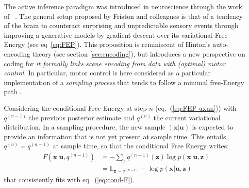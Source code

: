 \documentclass[12pt,twoside,openright]{article}
\begin{document}
The active inference paradigm was introduced in neuroscience through the work of ~\cite{friston2010free,friston2012perceptions}. %
The general setup proposed by Friston and colleagues is that of a tendency of the brain to counteract surprising and unpredictable sensory events through 
improving a generative models by gradient descent over its variational Free Energy (see eq~\ref{eq:FEP}). 
This proposition is reminiscent of Hinton's auto-encoding theory (see section \ref{sec:encoding}), but introduces a new perspective on coding
for \emph{it formally links scene encoding from data with (optimal) motor control}.
In particular, motor control is here considered as a particular implementation of a \emph{sampling process}
that tends to follow a minimal free-Energy path \cite{friston2015active}.

Considering the conditional Free Energy at step $n$ (eq.~(\ref{eq:FEP-uxun}))
with $q^{(n-1)}$ the previous posterior estimate and $q^{(n)}$ the current variational distribution. In a sampling procedure, the new sample 
$(\boldsymbol{x}|\boldsymbol{u})$ is expected to provide an information that is not yet present at sample time. This entails 
$q^{(n)} = q^{(n-1)}$ at sample time, so that the conditional Free Energy writes:
\begin{align}
F(\boldsymbol{x}|\boldsymbol{u}, q^{(n-1)}) &= -\sum_z q^{(n-1)}(\boldsymbol{z}) \log p(\boldsymbol{x}|\boldsymbol{u}, \boldsymbol{z})\nonumber\\
&= \mathbb{E}_{\boldsymbol{z} \sim q^{(n-1)}} -\log p(\boldsymbol{x}|\boldsymbol{u}, \boldsymbol{z})
\end{align}
that consistently fits with eq.~(\ref{eq:cond-F}).
\end{document}

